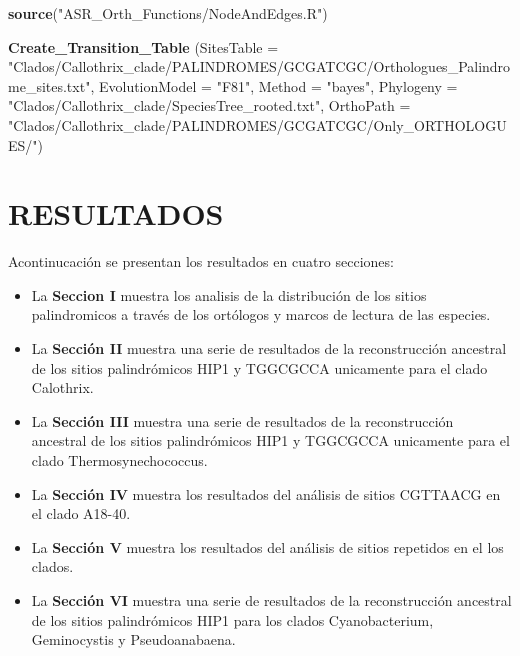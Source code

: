 \documentclass[
]{book}
\newenvironment{Shaded}{\begin{snugshade}}{\end{snugshade}}
\newcommand{\AttributeTok}[1]{\textcolor[rgb]{0.13,0.29,0.53}{#1}}
\newcommand{\FunctionTok}[1]{\textcolor[rgb]{0.13,0.29,0.53}{\textbf{#1}}}
\newcommand{\NormalTok}[1]{#1}
\newcommand{\StringTok}[1]{\textcolor[rgb]{0.31,0.60,0.02}{#1}}
\begin{document}
\begin{Shaded}
\begin{Highlighting}[]
\FunctionTok{source}\NormalTok{(}\StringTok{"ASR\_Orth\_Functions/NodeAndEdges.R"}\NormalTok{)}

\FunctionTok{Create\_Transition\_Table}\NormalTok{ (}\AttributeTok{SitesTable =} \StringTok{"Clados/Callothrix\_clade/PALINDROMES/GCGATCGC/Orthologues\_Palindrome\_sites.txt"}\NormalTok{,}
                                \AttributeTok{EvolutionModel =} \StringTok{"F81"}\NormalTok{,}
                                \AttributeTok{Method =} \StringTok{"bayes"}\NormalTok{,}
                                \AttributeTok{Phylogeny =} \StringTok{"Clados/Callothrix\_clade/SpeciesTree\_rooted.txt"}\NormalTok{,}
                                \AttributeTok{OrthoPath =} \StringTok{"Clados/Callothrix\_clade/PALINDROMES/GCGATCGC/Only\_ORTHOLOGUES/"}\NormalTok{)}
\end{Highlighting}
\end{Shaded}

\hypertarget{resultados}{%
\chapter{RESULTADOS}\label{resultados}}

Acontinucación se presentan los resultados en cuatro secciones:

\begin{itemize}
\item
  La \textbf{Seccion I} muestra los analisis de la distribución de los sitios palindromicos a través de los ortólogos y marcos de lectura de las especies.
\item
  La \textbf{Sección II} muestra una serie de resultados de la reconstrucción ancestral de los sitios palindrómicos HIP1 y TGGCGCCA unicamente para el clado Calothrix.
\item
  La \textbf{Sección III} muestra una serie de resultados de la reconstrucción ancestral de los sitios palindrómicos HIP1 y TGGCGCCA unicamente para el clado Thermosynechococcus.
\item
  La \textbf{Sección IV} muestra los resultados del análisis de sitios CGTTAACG en el clado A18-40.
\item
  La \textbf{Sección V} muestra los resultados del análisis de sitios repetidos en el los clados.
\item
  La \textbf{Sección VI} muestra una serie de resultados de la reconstrucción ancestral de los sitios palindrómicos HIP1 para los clados Cyanobacterium, Geminocystis y Pseudoanabaena.
\end{itemize}
\end{document}
